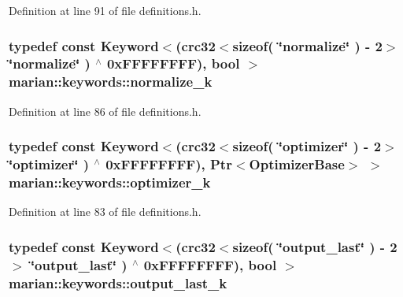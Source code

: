 Definition at line 91 of file definitions.\+h.

\subsubsection[{\texorpdfstring{normalize\+\_\+k}{normalize_k}}]{\setlength{\rightskip}{0pt plus 5cm}typedef const {\bf Keyword}$<$({\bf crc32}$<$sizeof( \char`\"{}normalize\char`\"{} ) -\/ 2$>$ \char`\"{}{\bf normalize}\char`\"{} ) $^\wedge$ 0x\+F\+F\+F\+F\+F\+F\+F\+F), bool $>$ marian\+::keywords\+::normalize\+\_\+k}\hypertarget{namespacemarian_1_1keywords_a2d4daed65d80e72c0e922a6e7359f31d}{}\label{namespacemarian_1_1keywords_a2d4daed65d80e72c0e922a6e7359f31d}


Definition at line 86 of file definitions.\+h.

\subsubsection[{\texorpdfstring{optimizer\+\_\+k}{optimizer_k}}]{\setlength{\rightskip}{0pt plus 5cm}typedef const {\bf Keyword}$<$({\bf crc32}$<$sizeof( \char`\"{}optimizer\char`\"{} ) -\/ 2$>$ \char`\"{}{\bf optimizer}\char`\"{} ) $^\wedge$ 0x\+F\+F\+F\+F\+F\+F\+F\+F), Ptr$<$\+Optimizer\+Base$>$ $>$ marian\+::keywords\+::optimizer\+\_\+k}\hypertarget{namespacemarian_1_1keywords_a1ab9bde7cf138c91b907dcdd052dfa6b}{}\label{namespacemarian_1_1keywords_a1ab9bde7cf138c91b907dcdd052dfa6b}


Definition at line 83 of file definitions.\+h.

\subsubsection[{\texorpdfstring{output\+\_\+last\+\_\+k}{output_last_k}}]{\setlength{\rightskip}{0pt plus 5cm}typedef const {\bf Keyword}$<$({\bf crc32}$<$sizeof( \char`\"{}output\+\_\+last\char`\"{} ) -\/ 2$>$ \char`\"{}{\bf output\+\_\+last}\char`\"{} ) $^\wedge$ 0x\+F\+F\+F\+F\+F\+F\+F\+F), bool $>$ marian\+::keywords\+::output\+\_\+last\+\_\+k}\hypertarget{namespacemarian_1_1keywords_afaaf278d8f77b3c17f0cf76af88bea1e}{}\label{namespacemarian_1_1keywords_afaaf278d8f77b3c17f0cf76af88bea1e}



